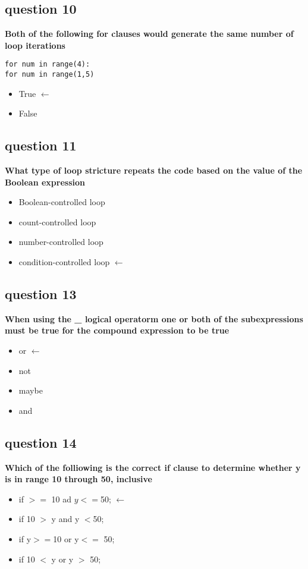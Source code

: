 \documentclass[10pt]{article}
\begin{document}
\subsection*{question 10}
\textbf{Both of the following for clauses would generate the same number of loop iterations}
\begin{verbatim}
for num in range(4):
for num in range(1,5)
\end{verbatim}
\begin{itemize}
\item True $\leftarrow$
\item False
\end{itemize}
\subsection*{question 11}
\textbf{What type of loop stricture repeats the code based on the value of the Boolean expression}
\begin{itemize}
\item Boolean-controlled loop
\item count-controlled loop
\item number-controlled loop
\item  condition-controlled loop $\leftarrow$
\end{itemize}
\subsection*{question 13}
\textbf{When using the \_ logical operatorm one or both of the subexpressions must be true for the compound expression to be true}
\begin{itemize}
\item or $\leftarrow$
\item not
\item maybe 
\item and
\end{itemize}
\subsection*{question 14}
\textbf{Which of the folliowing is the correct if clause to determine whether y is in range 10 through 50, inclusive}
\begin{itemize}
\item if $>=$ 10 ad $y<=$50; $\leftarrow$
\item if 10 $>$ y and y $<$50;
\item if y$>=$10 or y$<=$ 50;
\item if 10 $<$ y or y $>$ 50;
\end{itemize}
\end{document}
